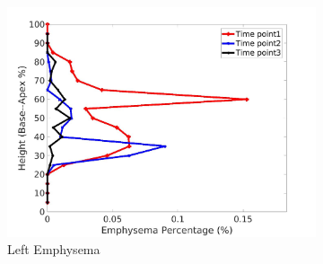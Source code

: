 \begin{figure}[H]
\begin{subfigure}{.42\linewidth}
  \includegraphics[width=\linewidth,trim={{.0\wd0} {.0\wd0} {.0\wd0} {.0\wd0}},clip]{Appendix/Image_AppexA/BaseToApex/IPF3LeftLungEmphysemaDiseaseAgainstHeight.jpg} %
  \caption{Left Emphysema}
  \label{fig:IPF3DiseaseAgainstHeight-g} 
\end{subfigure} 
\begin{subfigure}{.42\linewidth}%

\end{subfigure}
\end{figure}
